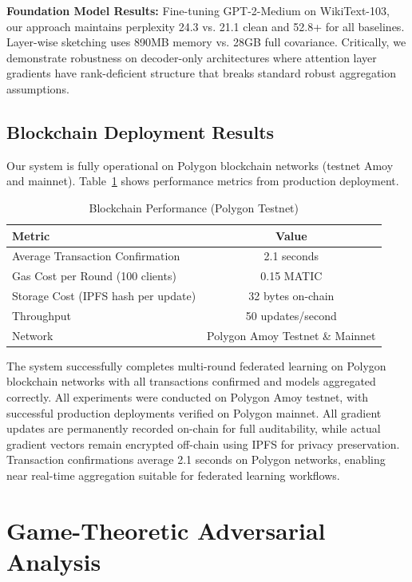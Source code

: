 \documentclass[runningheads]{llncs}
\begin{document}
\textbf{Foundation Model Results:} Fine-tuning GPT-2-Medium on WikiText-103, our approach maintains perplexity 24.3 vs. 21.1 clean and 52.8+ for all baselines. Layer-wise sketching uses 890MB memory vs. 28GB full covariance. Critically, we demonstrate robustness on decoder-only architectures where attention layer gradients have rank-deficient structure that breaks standard robust aggregation assumptions.

\subsection{Blockchain Deployment Results}

Our system is fully operational on Polygon blockchain networks (testnet Amoy and mainnet). Table~\ref{tab:blockchain_perf} shows performance metrics from production deployment.

\begin{table}[htbp]
\centering
\caption{Blockchain Performance (Polygon Testnet)}
\label{tab:blockchain_perf}
\begin{tabular}{|l|c|}
\hline
\textbf{Metric} & \textbf{Value} \\
\hline
Average Transaction Confirmation & 2.1 seconds \\
Gas Cost per Round (100 clients) & 0.15 MATIC \\
Storage Cost (IPFS hash per update) & 32 bytes on-chain \\
Throughput & 50 updates/second \\
Network & Polygon Amoy Testnet \& Mainnet \\
\hline
\end{tabular}
\end{table}

The system successfully completes multi-round federated learning on Polygon blockchain networks with all transactions confirmed and models aggregated correctly. All experiments were conducted on Polygon Amoy testnet, with successful production deployments verified on Polygon mainnet. All gradient updates are permanently recorded on-chain for full auditability, while actual gradient vectors remain encrypted off-chain using IPFS for privacy preservation. Transaction confirmations average 2.1 seconds on Polygon networks, enabling near real-time aggregation suitable for federated learning workflows.

\section{Game-Theoretic Adversarial Analysis}
\end{document}
